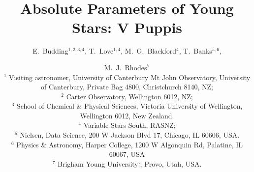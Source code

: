 \documentclass[useAMS,usenatbib]{mnras}                                                                           \usepackage[pdftex]{graphicx}
\begin{document}
\title[Absolute Parameters of Young Stars]{Absolute Parameters of Young Stars: V Puppis}

\author[E.\ Budding et al.]{E.\ Budding$^{1,2,3,4}$, T.\ Love$^{1,4}$, M.\ G.\ Blackford$^{4}$,  
 T.\ Banks$^{5,6}$, \and M.\ J.\ Rhodes$^{7}$  
\vspace{2ex}\\
$^{1}$ Visiting astronomer, University of Canterbury Mt John Observatory, University of Canterbury, Private Bag 4800, Christchurch 8140, NZ; \\   
$^{2}$ Carter Observatory, Wellington 6012, NZ;\\
$^{3}$ School of Chemical \& Physical Sciences, Victoria University of Wellington, Wellington 6012, New Zealand.\\
$^{4}$ Variable Stars South, RASNZ; \\ 
$^{5}$ Nielsen, Data Science, 200 W Jackson Blvd 17, Chicago, IL 60606, USA. \\
$^{6}$ Physics \& Astronomy, Harper College, 1200 W Algonquin Rd, Palatine, IL 60067, USA \\
$^{7}$ Brigham Young University`, Provo, Utah, USA.\\
}

 
\maketitle

\end{document}
